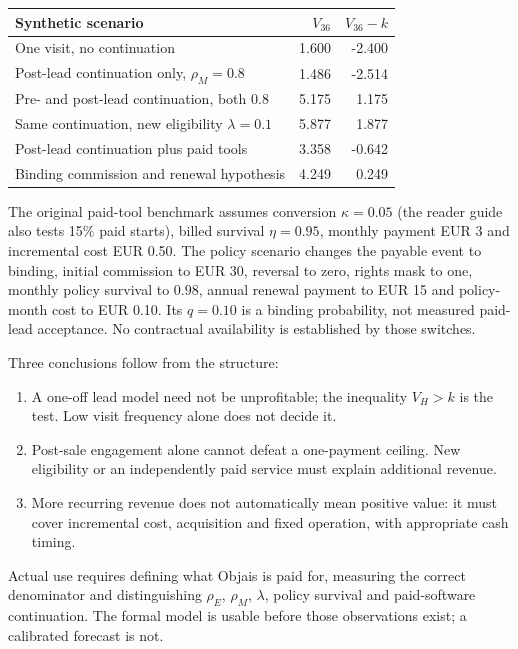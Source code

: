 \documentclass[11pt,a4paper]{article}
\begin{document}
\begin{center}
\begin{tabular}{@{}p{91mm}rr@{}}
\toprule Synthetic scenario & $V_{36}$ & $V_{36}-k$\\
\midrule
One visit, no continuation & 1.600 & -2.400\\
Post-lead continuation only, $\rho_M=0.8$ & 1.486 & -2.514\\
Pre- and post-lead continuation, both $0.8$ & 5.175 & 1.175\\
Same continuation, new eligibility $\lambda=0.1$ & 5.877 & 1.877\\
Post-lead continuation plus paid tools & 3.358 & -0.642\\
Binding commission and renewal hypothesis & 4.249 & 0.249\\
\bottomrule
\end{tabular}
\end{center}
The original paid-tool benchmark assumes conversion $\kappa=0.05$ (the reader guide also tests 15\% paid starts), billed survival $\eta=0.95$, monthly payment EUR 3 and incremental cost EUR 0.50. The policy scenario changes the payable event to binding, initial commission to EUR 30, reversal to zero, rights mask to one, monthly policy survival to $0.98$, annual renewal payment to EUR 15 and policy-month cost to EUR 0.10. Its $q=0.10$ is a binding probability, not measured paid-lead acceptance. No contractual availability is established by those switches.

Three conclusions follow from the structure:
\begin{enumerate}
\item A one-off lead model need not be unprofitable; the inequality $V_H>k$ is the test. Low visit frequency alone does not decide it.
\item Post-sale engagement alone cannot defeat a one-payment ceiling. New eligibility or an independently paid service must explain additional revenue.
\item More recurring revenue does not automatically mean positive value: it must cover incremental cost, acquisition and fixed operation, with appropriate cash timing.
\end{enumerate}

Actual use requires defining what Objais is paid for, measuring the correct denominator and distinguishing $\rho_E$, $\rho_M$, $\lambda$, policy survival and paid-software continuation. The formal model is usable before those observations exist; a calibrated forecast is not.
\end{document}
